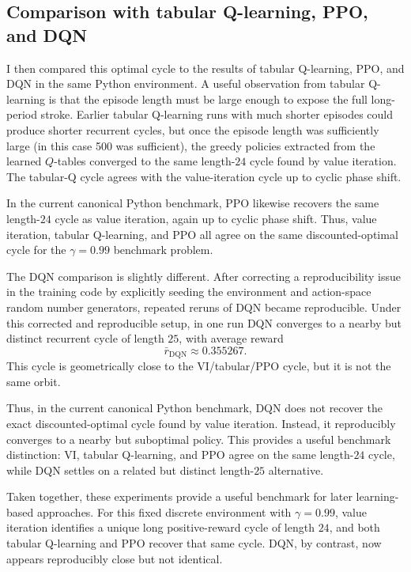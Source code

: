 \documentclass{article}
\begin{document}
\subsection{Comparison with tabular Q-learning, PPO, and DQN}

I then compared this optimal cycle to the results of tabular Q-learning, PPO, and DQN in the same  Python environment.  A useful observation from tabular Q-learning is that the episode length must be large enough to expose the full long-period stroke. Earlier tabular Q-learning runs with much shorter episodes could produce shorter recurrent cycles, but once the episode length was sufficiently large (in this case 500 was sufficient), the greedy policies extracted from the learned $Q$-tables converged to the same length-$24$ cycle found by value iteration. The tabular-Q cycle agrees with the value-iteration cycle up to cyclic phase shift.

In the current canonical Python benchmark, PPO likewise recovers the same length-$24$ cycle as value iteration, again up to cyclic phase shift. Thus, value iteration, tabular Q-learning, and PPO all agree on the same discounted-optimal cycle for the $\gamma=0.99$ benchmark problem.

The DQN comparison is slightly different. After correcting a reproducibility issue in the training code by explicitly seeding the environment and action-space random number generators, repeated reruns of DQN became reproducible. Under this corrected and reproducible setup, in one run DQN converges to a nearby but distinct recurrent cycle of length $25$, with average reward
\[
\bar r_{\mathrm{DQN}} \approx 0.355267.
\]
This cycle is geometrically close to the VI/tabular/PPO cycle, but it is not the same orbit.

Thus, in the current canonical Python benchmark, DQN does not recover the exact discounted-optimal cycle found by value iteration. Instead, it reproducibly converges to a nearby but suboptimal policy. This provides a useful benchmark distinction: VI, tabular Q-learning, and PPO agree on the same length-$24$ cycle, while DQN settles on a related but distinct length-$25$ alternative.


Taken together, these experiments provide a useful benchmark for later learning-based approaches. For this fixed discrete environment with $\gamma=0.99$, value iteration identifies a unique long positive-reward cycle of length $24$, and both tabular Q-learning and PPO recover that same cycle. DQN, by contrast, now appears reproducibly close but not identical. 
\end{document}

